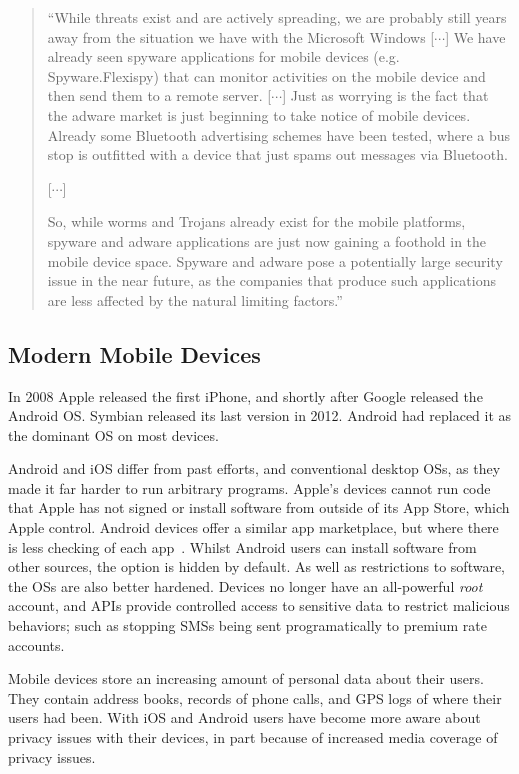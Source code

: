 \documentclass[thesis.tex]{subfiles}
\begin{document}
\begin{quote}
  ``While threats exist and are actively spreading, we are probably
  still years away from the situation we have with the Microsoft Windows
  [$\cdots$] We have already seen spyware applications for mobile devices
  (e.g. Spyware.Flexispy) that can monitor activities on the mobile
  device and then send them to a remote server. [$\cdots$] Just as
  worrying is the fact that the adware market is just beginning to take
  notice of mobile devices. Already some Bluetooth advertising schemes
  have been tested, where a bus stop is outfitted with a device that
  just spams out messages via Bluetooth.

  [$\cdots$]
  
  So, while worms and Trojans already exist for the mobile
  platforms, spyware and adware applications are just now gaining a
  foothold in the mobile device space. Spyware and adware pose a
  potentially large security issue in the near future, as the companies
  that produce such applications are less affected by the natural
  limiting factors.''
\end{quote}

\subsection{Modern Mobile Devices}

In 2008 Apple released the first iPhone, and shortly after Google
released the Android OS.  Symbian released its last version in
2012.  Android had replaced it as the dominant OS on most devices.  

Android and iOS differ from past efforts, and conventional desktop OSs, as they
made it far harder to run arbitrary programs. Apple's devices cannot
run code that Apple has not signed or install software from outside of its App
Store, which Apple control. Android devices offer a similar app marketplace,
but where there is less checking of each
app~\cite{oberheide_dissecting_2012}. Whilst Android users can install software
from other sources, the option is hidden by default. As well as restrictions to
software, the OSs are also better hardened. Devices no longer have an all-powerful
\emph{root} account, and APIs provide controlled access to
sensitive data to restrict malicious behaviors; such as stopping SMSs being
sent programatically to premium rate accounts.

Mobile devices store an increasing amount of personal data about their users.
They contain address books, records of phone calls, and GPS logs of where their
users had been. With iOS and Android users have become more aware about privacy
issues with their devices, in part because of increased media coverage of
privacy issues.
\end{document}
